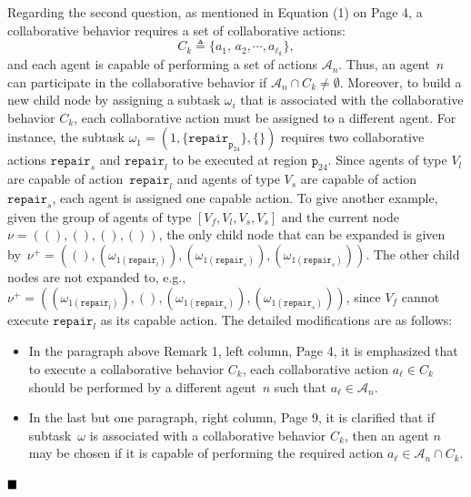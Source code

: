 \documentclass[10pt]{article}
\begin{document}
Regarding the second question, as mentioned in Equation (1) on Page 4,
a collaborative behavior requires a set of collaborative actions:
$$C_k\triangleq \{a_1,\,a_2,\cdots,a_{\ell_k}\},$$ and each agent
is capable of performing a set of actions $\mathcal{A}_n$.
Thus, an agent~$n$ can participate in the collaborative behavior
if $\mathcal{A}_n\cap C_k\neq \emptyset$.
Moreover, to build a new child node by assigning a subtask $\omega_i$
that is associated with the collaborative behavior $C_k$,
each collaborative action must be assigned to a different agent.
For instance, the subtask $\omega_1=(1,\{\texttt{repair}_{\texttt{p}_{24}}\},\{\})$
requires two collaborative actions $\texttt{repair}_s$ and $\texttt{repair}_l$
to be executed at region $\texttt{p}_{24}$.
Since agents of type $V_l$ are capable of action~$\texttt{repair}_l$ and agents of type $V_s$
are capable of action $\texttt{repair}_s$,
each agent is assigned one capable action.
To give another example, given the group of agents of type $[V_f,V_l,V_s,V_s]$ and the current node $\nu=((),(),(),())$,
the only child node that can be expanded is given by~$\nu^+=((), (\omega_{1(\texttt{repair}_l)}),(\omega_{1(\texttt{repair}_s)}),(\omega_{1(\texttt{repair}_s)}))$.
The other child nodes are not expanded to, e.g.,
$\nu^+=((\omega_{1(\texttt{repair}_l)}),(),(\omega_{1(\texttt{repair}_s)}),(\omega_{1(\texttt{repair}_s)}))$, since $V_f$ cannot execute $\texttt{repair}_l$ as its capable action.
The detailed modifications are as follows:
\begin{itemize}
\item In the paragraph above Remark 1, left column, Page 4, it is emphasized that
to execute a collaborative behavior $C_k$, each collaborative action $a_{\ell}\in C_k$
should be performed by a different agent~$n$ such that $a_\ell\in \mathcal{A}_n$.

\item In the last but one paragraph, right column, Page 9, it is clarified that
if subtask~$\omega$ is associated with a collaborative behavior $C_k$, then
an agent $n$ may be chosen if it is capable of performing
the required action $a_\ell\in\mathcal{A}_n\cap C_k$.
\end{itemize}
$\hfill\blacksquare$




\hspace*{\fill} \

\end{document}
